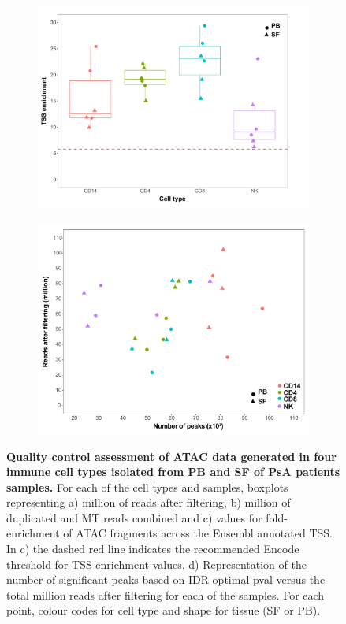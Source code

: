\begin{figure}[H]
\begin{subfigure}[b]{0.48\textwidth}
\includegraphics[width=\textwidth]{./Results3/pdfs/ATAC_PSA_all_TSS_max_per_cell_type}%
\caption{}
\end{subfigure}
\begin{subfigure}[b]{0.48\textwidth} 
\centering
\includegraphics[width=\textwidth]{./Results3/pdfs/ATAC_PSA_all_peaks_vs_num_reads}%
\caption{}
\end{subfigure}
\caption[Quality control assessment of ATAC data generated in four immune cell types isolated from PB and SF of PsA patients samples.]{\textbf{Quality control assessment of ATAC data generated in four immune cell types isolated from PB and SF of PsA patients samples.} For each of the cell types and samples, boxplots representing a) million of reads after filtering, b) million of duplicated and MT reads combined and c) values for fold-enrichment of ATAC fragments across the Ensembl annotated TSS. In c) the dashed red line indicates the recommended Encode threshold for TSS enrichment values. d) Representation of the  number of significant peaks based on IDR optimal pval versus the total million reads after filtering for each of the samples. For each point, colour codes for cell type and shape for tissue (SF or PB).}
\label{figure:PsA_FAST_ATAC_QC}
\end{figure}


